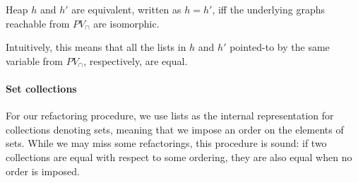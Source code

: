 \documentclass[runningheads,a4paper]{llncs}
\begin{document}
\begin{definition} \label{def:equiv-heaps}
%
Heap $h$ and $h'$ are equivalent, written as $h{=}h'$, 
iff the underlying graphs reachable from $PV_{\cap}$ are isomorphic.
%
\end{definition}

Intuitively, this means that all the lists in $h$ and $h'$ pointed-to by the
same variable from $PV_{\cap}$, respectively, are equal.

\paragraph{Set collections}

For our refactoring procedure, we use lists as the internal representation
for collections denoting sets, meaning that we impose an order on the
elements of sets.  While we may miss some refactorings, this procedure is
sound: if two collections are equal with respect to some ordering, they are
also equal when no order is imposed.
\end{document}
